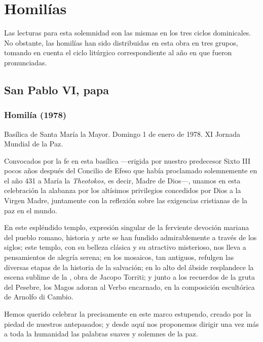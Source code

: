 \section{Homilías}

Las lecturas para esta solemnidad son las mismas en los tres ciclos dominicales. No obstante, las homilías han sido distribuidas en esta obra en tres grupos, tomando en cuenta el ciclo litúrgico correspondiente al año en que fueron pronunciadas.

\subsection{San Pablo VI, papa}
\subsubsection{Homilía (1978)}
Basílica de Santa María la Mayor. Domingo 1 de enero de 1978. XI Jornada Mundial de la Paz.

Convocados por la fe en esta basílica ---erigida por nuestro predecesor Sixto III pocos años después del Concilio de Efeso que había proclamado solemnemente en el año 431 a María la \emph{Theotokos,} es decir, Madre de Dios---, unamos en esta celebración la alabanza por los altísimos privilegios concedidos por Dios a la Virgen Madre, juntamente con la reflexión sobre las exigencias cristianas de la paz en el mundo.

En este espléndido templo, expresión singular de la ferviente devoción mariana del pueblo romano, historia y arte se han fundido admirablemente a través de los siglos; este templo, con su belleza clásica y su atractivo misterioso, nos lleva a pensamientos de alegría serena; en los mosaicos, tan antiguos, refulgen las diversas etapas de la historia de la salvación; en lo alto del ábside resplandece la escena sublime de la , obra de Jacopo Torriti; y junto a los recuerdos de la gruta del Pesebre, los Magos adoran al Verbo encarnado, en la composición escultórica de Arnolfo di Cambio.

Hemos querido celebrar la  precisamente en este marco estupendo, creado por la piedad de nuestros antepasados; y desde aquí nos proponemos dirigir una vez más a toda la humanidad las palabras suaves y solemnes de la paz.

